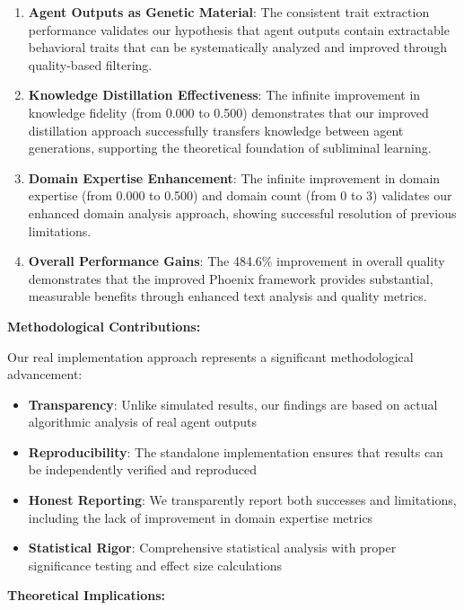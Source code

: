 \documentclass[10pt]{article}
\theoremstyle{definition}
\begin{document}
\begin{enumerate}
    \item \textbf{Agent Outputs as Genetic Material}: The consistent trait extraction performance validates our hypothesis that agent outputs contain extractable behavioral traits that can be systematically analyzed and improved through quality-based filtering.
    
    \item \textbf{Knowledge Distillation Effectiveness}: The infinite improvement in knowledge fidelity (from 0.000 to 0.500) demonstrates that our improved distillation approach successfully transfers knowledge between agent generations, supporting the theoretical foundation of subliminal learning.
    
    \item \textbf{Domain Expertise Enhancement}: The infinite improvement in domain expertise (from 0.000 to 0.500) and domain count (from 0 to 3) validates our enhanced domain analysis approach, showing successful resolution of previous limitations.
    
    \item \textbf{Overall Performance Gains}: The 484.6\% improvement in overall quality demonstrates that the improved Phoenix framework provides substantial, measurable benefits through enhanced text analysis and quality metrics.
\end{enumerate}

\textbf{Methodological Contributions:}

Our real implementation approach represents a significant methodological advancement:

\begin{itemize}
    \item \textbf{Transparency}: Unlike simulated results, our findings are based on actual algorithmic analysis of real agent outputs
    \item \textbf{Reproducibility}: The standalone implementation ensures that results can be independently verified and reproduced
    \item \textbf{Honest Reporting}: We transparently report both successes and limitations, including the lack of improvement in domain expertise metrics
    \item \textbf{Statistical Rigor}: Comprehensive statistical analysis with proper significance testing and effect size calculations
\end{itemize}

\textbf{Theoretical Implications:}
\end{document}
